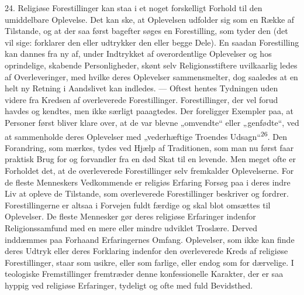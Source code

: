 \documentclass[12pt,a4paper,openany]{book}
\newcommand{\opage}[1]{\marginnote{\footnotesize\textit{[#1]}}}
\begin{document}
24. Religiøse Forestillinger kan staa i et noget forskelligt Forhold til
den umiddelbare Oplevelse. Det kan ske, at Oplevelsen udfolder sig som
en Række af Tilstande, og at der saa først bagefter søges en
Forestilling, som tyder den (det vil sige: forklarer den eller udtrykker
den eller begge Dele). En saadan Forestilling kan dannes fra ny af,
under Indtrykket af overordentlige Oplevelser og hos oprindelige,
skabende Personligheder, skønt selv Religionsstiftere uvilkaarlig ledes
af Overleveringer, med hvilke deres Oplevelser sammensmelter, dog
saaledes at en helt ny Retning i Aandslivet kan indledes. --- Oftest
hentes Tydningen uden videre fra Kredsen af overleverede Forestillinger.
Forestillinger, der vel forud havdes og kendtes, men ikke særligt
paaagtedes. Der foreligger Exempler paa, at Personer først bliver klare
over, at de var blevne „omvendte“ eller „genfødte“, ved at sammenholde
deres Oplevelser med „vederhæftige Troendes Udsagn“\textsuperscript{26}.
Den Forandring, som mærkes, tydes ved Hjælp af Traditionen, som man nu
først faar praktisk Brug for og forvandler fra en død Skat til en
levende. Men meget ofte er Forholdet det, at de overleverede
Forestillinger selv fremkalder Oplevelserne. For de fleste Menneskers
Vedkommende er religiøs Erfaring Forsøg paa i deres indre Liv at opleve
de Tilstande, som overleverede Forestillinger beskriver og fordrer.
Forestillingerne er altsaa i Forvejen fuldt færdige og skal blot
omsættes til Oplevelser. De fleste Mennesker gør deres religiøse
Erfaringer indenfor Religionssamfund med en mere eller mindre udviklet
Troslære. Derved inddæmmes paa Forhaand Erfaringernes Omfang.
Oplevelser, som ikke kan finde deres Udtryk eller deres Forklaring
indenfor den overleverede Kreds af religiøse Forestillinger, staar som
usikre, eller som farlige, eller endog som for%
\opage{60}dærvelige. I teologiske Fremstillinger fremtræder denne
konfessionelle Karakter, der er saa hyppig ved religiøse Erfaringer,
tydeligt og ofte med fuld Bevidsthed.
\end{document}

